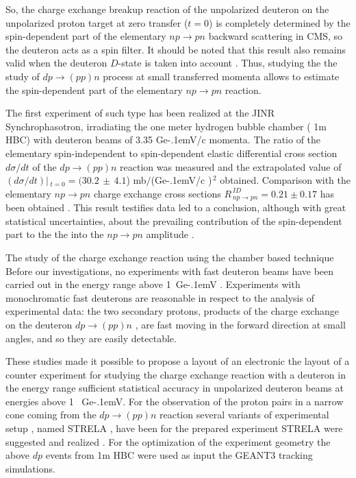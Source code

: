 \documentclass[twocolumn,epjc3]{svjour3}
\newcommand{\np}     {\ensuremath{np \rightarrow pn}\xspace}
\newcommand{\dpchex} {\ensuremath{dp \rightarrow (pp)n}\xspace}
\newcommand{\GeVc}   {Ge\kern-.1emV/c\xspace}
\newcommand{\GeV}    {Ge\kern-.1emV\xspace}
\providecommand{\DIFaddtex}[1]{{\protect\color{Green} \sf #1}} %
\providecommand{\DIFdeltex}[1]{{\protect\color{Red} \scriptsize #1}} %
\providecommand{\DIFaddbegin}{} %
\providecommand{\DIFaddend}{} %
\providecommand{\DIFdelbegin}{} %
\providecommand{\DIFdelend}{} %
\providecommand{\DIFadd}[1]{\texorpdfstring{\DIFaddtex{#1}}{#1}} %
\providecommand{\DIFdel}[1]{\texorpdfstring{\DIFdeltex{#1}}{}} %
\newcommand{\DIFscaledelfig}{0.5}
\newlength{\DIFdelgraphicswidth} %
\newlength{\DIFdelgraphicsheight} %
\newcommand{\DIFaddincludegraphics}[2][]{{\color{blue}\fbox{\DIFOincludegraphics[#1]{#2}}}} %
\newcommand{\DIFdelincludegraphics}[2][]{%
\sbox{\DIFdelgraphicsbox}{\DIFOincludegraphics[#1]{#2}}%
\settoboxwidth{\DIFdelgraphicswidth}{\DIFdelgraphicsbox} %
\settoboxtotalheight{\DIFdelgraphicsheight}{\DIFdelgraphicsbox} %
\scalebox{\DIFscaledelfig}{%
\parbox[b]{\DIFdelgraphicswidth}{\usebox{\DIFdelgraphicsbox}\\[-\baselineskip] \rule{\DIFdelgraphicswidth}{0em}}\llap{\resizebox{\DIFdelgraphicswidth}{\DIFdelgraphicsheight}{%
\setlength{\unitlength}{\DIFdelgraphicswidth}%
\begin{picture}(1,1)%
\thicklines\linethickness{2pt} %
{\color[rgb]{1,0,0}\put(0,0){\framebox(1,1){}}}%
{\color[rgb]{1,0,0}\put(0,0){\line( 1,1){1}}}%
{\color[rgb]{1,0,0}\put(0,1){\line(1,-1){1}}}%
\end{picture}%
}\hspace*{3pt}}} %
} %
\DeclareRobustCommand{\DIFaddbegin}{\DIFOaddbegin \let\includegraphics\DIFaddincludegraphics} %
\DeclareRobustCommand{\DIFaddend}{\DIFOaddend \let\includegraphics\DIFOincludegraphics} %
\DeclareRobustCommand{\DIFdelbegin}{\DIFOdelbegin \let\includegraphics\DIFdelincludegraphics} %
\DeclareRobustCommand{\DIFdelend}{\DIFOaddend \let\includegraphics\DIFOincludegraphics} %
\begin{document}
So, the charge exchange breakup reaction of the unpolarized deuteron on the
unpolarized proton target at zero transfer ($t = 0$) is completely determined by
the spin-dependent part of the elementary \np backward scattering in CMS, so the
deuteron acts as a spin filter. It should be noted that this result also remains
valid when the deuteron $D$-state is taken into account \cite{led04}. Thus, \DIFdelbegin \DIFdel{studying the
}\DIFdelend \DIFaddbegin \DIFadd{the
study of }\DIFaddend \dpchex process at small transferred momenta allows to estimate the
spin-dependent part of the elementary \np reaction.

The first experiment of such type has been realized at the JINR
Synchrophasotron, irradiating the one meter hydrogen bubble chamber (\DIFaddbegin \DIFadd{1m }\DIFaddend HBC)
with deuteron beams of 3.35 \GeVc momenta. The \DIFdelbegin \DIFdel{ratio of the elementary
spin-independent to spin-dependent elastic }\DIFdelend \DIFaddbegin \DIFadd{differential cross section
$d\sigma/dt$ of the }\dpchex \DIFadd{reaction was measured and the extra\-polated value
of $(d\sigma/dt)|\,_{t=0}=(30.2\,\pm\,4.1$) mb$/$(}\GeVc\DIFadd{)$^{\,2}$ obtained.
Comparison with the elementary }\DIFaddend \np charge exchange \DIFdelbegin \DIFdel{cross sections
$R^{\,ID}_{\,\np} = 0.21 \pm 0.17$ has been obtained \cite{gla08}. This result
testifies }\DIFdelend \DIFaddbegin \DIFadd{data led to a conclusion,
although with great statistical uncertainties, about }\DIFaddend the prevailing contribution
of the spin-dependent part \DIFdelbegin \DIFdel{to the the }\DIFdelend \DIFaddbegin \DIFadd{into the }\DIFaddend \np amplitude \cite{gla02,gla08}.

\DIFdelbegin \DIFdel{The study of the charge exchange reaction using the chamber based technique }\DIFdelend \DIFaddbegin \DIFadd{Before our investigations, no experiments with fast deu\-teron beams have been
carried out in the energy range above 1~}\GeV\DIFadd{. Experiments with monochromatic
fast deuterons are reasonable in respect to the analysis of experimental data:
the two secondary protons, products of the charge exchange on the deuteron
}\dpchex\DIFadd{, are fast moving in the forward direction at small angles, and so they
are easily detectable.
}

\DIFadd{These studies }\DIFaddend made it possible to propose \DIFdelbegin \DIFdel{a layout of an electronic }\DIFdelend \DIFaddbegin \DIFadd{the layout of a counter }\DIFaddend experiment for
studying the charge exchange reaction with \DIFdelbegin \DIFdel{a deuteron in
the energy range }\DIFdelend \DIFaddbegin \DIFadd{sufficient statistical accuracy in
unpolarized deuteron beams at energies }\DIFaddend above 1\DIFaddbegin \DIFadd{~}\DIFaddend \GeV. For the observation of the
proton pairs in a narrow cone coming from the \dpchex reaction several variants
of experimental setup \DIFdelbegin \DIFdel{, named STRELA , have been
}\DIFdelend \DIFaddbegin \DIFadd{for the prepared experiment STRELA were }\DIFaddend suggested and
realized \cite{gla13}. \DIFaddbegin \DIFadd{For the optimization of the experiment geometry the above
$dp$ events from 1m HBC were used as input the GEANT3 tracking simulations.
}\DIFaddend 
\end{document}
